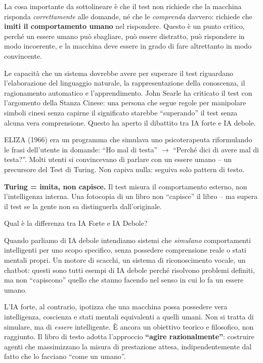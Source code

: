 \documentclass[12pt,a4paper]{article}
\begin{document}
La cosa importante da sottolineare è che il test non richiede che la macchina risponda \emph{correttamente} alle domande, né che le \emph{comprenda} davvero: richiede che \textbf{imiti il comportamento umano} nel rispondere. Questo è un punto critico, perché un essere umano può sbagliare, può essere distratto, può rispondere in modo incoerente, e la macchina deve essere in grado di fare altrettanto in modo convincente.

Le capacità che un sistema dovrebbe avere per superare il test riguardano l'elaborazione del linguaggio naturale, la rappresentazione della conoscenza, il ragionamento automatico e l'apprendimento. John Searle ha criticato il test con l'argomento della Stanza Cinese: una persona che segue regole per manipolare simboli cinesi senza capirne il significato starebbe ``superando'' il test senza alcuna vera comprensione. Questo ha aperto il dibattito tra IA forte e IA debole.

\begin{esempiobox}
ELIZA (1966) era un programma che simulava uno psicoterapeuta riformulando le frasi dell'utente in domande: ``Ho mal di testa'' $\to$ ``Perché dici di avere mal di testa?''. Molti utenti si convincevano di parlare con un essere umano -- un precursore del Test di Turing. Non capiva nulla: seguiva solo pattern di testo.
\end{esempiobox}

\begin{ricordabox}
\textbf{Turing = imita, non capisce.} Il test misura il comportamento esterno, non l'intelligenza interna. Una fotocopia di un libro non ``capisce'' il libro -- ma supera il test se la gente non sa distinguerla dall'originale.
\end{ricordabox}

\vspace{6pt}
\begin{domandabox}{Qual è la differenza tra IA Forte e IA Debole?}
\end{domandabox}

Quando parliamo di IA debole intendiamo sistemi che \emph{simulano} comportamenti intelligenti per uno scopo specifico, senza possedere comprensione reale o stati mentali propri. Un motore di scacchi, un sistema di riconoscimento vocale, un chatbot: questi sono tutti esempi di IA debole perché risolvono problemi definiti, ma non ``capiscono'' quello che stanno facendo nel senso in cui lo fa un essere umano.

L'IA forte, al contrario, ipotizza che una macchina possa possedere vera intelligenza, coscienza e stati mentali equivalenti a quelli umani. Non si tratta di simulare, ma di \emph{essere} intelligente. È ancora un obiettivo teorico e filosofico, non raggiunto. Il libro di testo adotta l'approccio \textbf{``agire razionalmente''}: costruire agenti che massimizzano la misura di prestazione attesa, indipendentemente dal fatto che lo facciano ``come un umano''.
\end{document}
